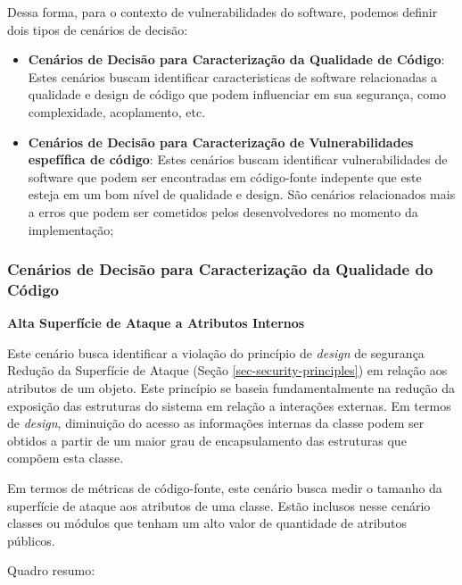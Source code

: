 %

Dessa forma, para o contexto de vulnerabilidades do software, podemos definir dois tipos de cenários de decisão:

%

\begin{itemize}
\item \textbf{Cenários de Decisão para Caracterização da Qualidade de Código}: Estes cenários buscam identificar caracteristicas de software relacionadas a qualidade e design de código que podem influenciar em sua segurança, como complexidade, acoplamento, etc.
\item \textbf{Cenários de Decisão para Caracterização de Vulnerabilidades espefífica de código}: Estes cenários buscam identificar vulnerabilidades de software que podem ser encontradas em código-fonte indepente que este esteja em um bom nível de qualidade e design. São cenários relacionados mais a erros que podem ser cometidos pelos desenvolvedores no momento da implementação;
\end{itemize}

%

\subsubsection{Cenários de Decisão para Caracterização da Qualidade do Código }

%

\textbf{Alta Superfície de Ataque a Atributos Internos}

%

Este cenário busca identificar a violação do princípio de \emph{design} de segurança Redução da Superfície de Ataque (Seção \ref{sec-security-principles}) em relação aos atributos de um objeto. Este princípio se baseia fundamentalmente na redução da exposição das estruturas do sistema em relação a interações externas. Em termos de \emph{design}, diminuição do acesso as informações internas da classe podem ser obtidos a partir de um maior grau de encapsulamento das estruturas que compõem esta classe. 

%

Em termos de métricas de código-fonte, este cenário busca medir o tamanho da superfície de ataque aos atributos de uma classe. Estão inclusos nesse cenário classes ou módulos que tenham um alto valor de quantidade de atributos públicos. 

%

Quadro resumo:

